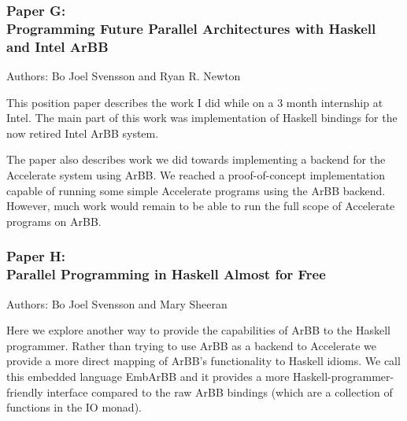 \documentclass[a4paper]{book}
\newcommand{\paperG}{Paper G}
\newcommand{\paperGTitle}{Programming Future Parallel Architectures with Haskell and Intel ArBB}
\newcommand{\paperH}{Paper H}
\newcommand{\paperHTitle}{Parallel Programming in Haskell Almost for Free}
\begin{document}
\subsubsection{\paperG: \\ \paperGTitle}

Authors: Bo Joel Svensson and Ryan R. Newton

\vspace{5mm}

\noindent This position paper describes the work I did while on a 3 month internship at 
Intel. The main part of this work was implementation of Haskell bindings 
for the now retired Intel ArBB system. 

The paper also describes work we did towards implementing a backend for the 
Accelerate system using ArBB. We reached a proof-of-concept implementation 
capable of running some simple Accelerate programs using the ArBB backend.
However, much work would remain to be able to run the full scope of Accelerate 
programs on ArBB.  

\subsubsection{\paperH: \\ \paperHTitle}

Authors: Bo Joel Svensson and Mary Sheeran 

\vspace{5mm}

\noindent Here we explore another way to provide the capabilities of ArBB to the 
Haskell programmer. Rather than trying to use ArBB as a backend to Accelerate 
we provide a more direct mapping of ArBB's functionality to Haskell idioms. 
We call this embedded language EmbArBB and it provides a more Haskell-programmer-friendly 
interface compared to the raw ArBB bindings (which are a collection of functions 
in the IO monad). 

%
%





\clearpage{}
\end{document}
